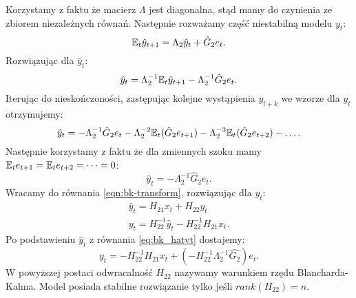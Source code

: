 Korzystamy z faktu że macierz $\Lambda$ jest diagonalna, stąd mamy do czynienia ze zbiorem niezależnych równań. Następnie rozważamy część niestabilną modelu $y_t$:
\begin{equation}
    \mathbb{E}_t \hat{y}_{t+1} = \Lambda_2 \hat{y}_t + \hat{G}_2 e_t.
\end{equation}
Rozwiązując dla $\hat{y}_t$:
\begin{equation}
    \hat{y}_t = \Lambda_2^{-1}\mathbb{E}_t \hat{y}_{t+1} - \Lambda_2^{-1}\hat{G}_2 e_t.
\end{equation}
Iterując do nieskończoności, zastępując kolejne wystąpienia $y_{t+k}$ we wzorze dla $y_t$ otrzymujemy:
\begin{equation}
    \hat{y}_t = -\Lambda_2^{-1}\hat{G}_2 e_t - \Lambda_2^{-2} \mathbb{E}_t(\hat{G}_2 e_{t+1}) - \Lambda_2^{-3}\mathbb{E}_t(\hat{G}_2 e_{t+2}) - \dots.
\end{equation}
Następnie korzystamy z faktu że dla zmiennych szoku mamy $\mathbb{E}_t e_{t+1} = \mathbb{E}_t e_{t+2} = \dots = 0$:
\begin{equation}
    \label{eq:bk_hatyt}
    \hat{y}_t = -\Lambda^{-1}_2\hat{G}_2 e_t.
\end{equation}
Wracamy do równania \eqref{eqn:bk-transform}, rozwiązując dla $y_t$:
\begin{equation}
    \begin{gathered}
        \hat{y}_t = H_{21} x_t + H_{22} y_t \\
        y_t = H_{22}^{-1} \hat{y}_t - H_{22}^{-1} H_{21} x_t.
    \end{gathered}
\end{equation}
Po podstawieniu $\hat{y}_t$ z równania \eqref{eq:bk_hatyt} dostajemy:
\begin{equation}
    y_t = -H_{22}^{-1} H_{21} x_t + (-H_{22}^{-1}\Lambda_2^{-1}\hat{G_2})e_t.
\end{equation}
W powyższej postaci odwracalność $H_{22}$ nazywamy warunkiem rzędu Blancharda-Kahna. Model posiada stabilne rozwiązanie tylko jeśli $rank(H_{22}) = n$.

